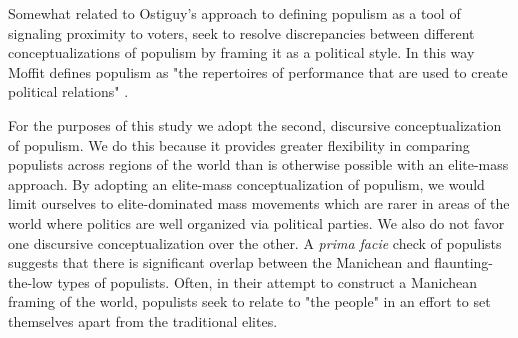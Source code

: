 \documentclass[a4paper,12pt]{article}\usepackage[]{graphicx}\usepackage[]{color}
\begin{document}
\par
Somewhat related to Ostiguy's approach to defining populism as a tool of signaling proximity to voters, \citet{moffitt2014rethinking, moffitt2016global} seek to resolve discrepancies between different conceptualizations of populism by framing it as a political style. In this way Moffit defines populism as "the repertoires of performance that are used to create political relations" \citep[p. 387]{moffitt2014rethinking}. 
\par
For the purposes of this study we adopt the second, discursive conceptualization of populism. We do this because it provides greater flexibility in comparing populists across regions of the world than is otherwise possible with an elite-mass approach. By adopting an elite-mass conceptualization of populism, we would limit ourselves to elite-dominated mass movements which are rarer in areas of the world where politics are well organized via political parties. We also do not favor one discursive conceptualization over the other. A \textit{prima facie} check of populists suggests that there is significant overlap between the Manichean \citep{hawkins2012measuring} and flaunting-the-low \citep{ostiguy2009high} types of populists. Often, in their attempt to construct a Manichean framing of the world, populists seek to relate to "the people" in an effort to set themselves apart from the traditional elites. 
\end{document}
